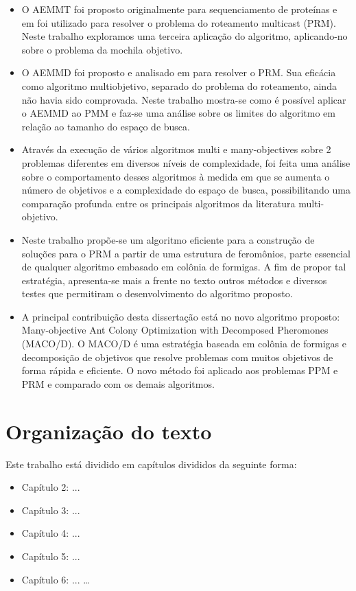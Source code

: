 \begin{itemize}  
	\item O AEMMT foi proposto originalmente para sequenciamento de proteínas \cite{Brasil2013} e em \cite{Lafeta2016} foi utilizado para resolver o problema do roteamento multicast (PRM). Neste trabalho exploramos uma terceira aplicação do algoritmo, aplicando-no sobre o problema da mochila objetivo.
	\item O AEMMD foi proposto e analisado em \cite{Lafeta2016} para resolver o PRM. Sua eficácia como algoritmo multiobjetivo, separado do problema do roteamento, ainda não havia sido comprovada. Neste trabalho mostra-se como é possível aplicar o AEMMD ao PMM e faz-se uma análise sobre os limites do algoritmo em relação ao tamanho do espaço de busca.
	\item Através da execução de vários algoritmos multi e many-objectives sobre 2 problemas diferentes em diversos níveis de complexidade, foi feita uma análise sobre o comportamento desses algoritmos à medida em que se aumenta o número de objetivos e a complexidade do espaço de busca, possibilitando uma comparação profunda entre os principais algoritmos da literatura multi-objetivo.
	\item Neste trabalho propõe-se um algoritmo eficiente para a construção de soluções para o PRM a partir de uma estrutura de feromônios, parte essencial de qualquer algoritmo embasado em colônia de formigas. A fim de propor tal estratégia, apresenta-se mais a frente no texto outros métodos e diversos testes que permitiram o desenvolvimento do algoritmo proposto. 
	\item A principal contribuição desta dissertação está no novo algoritmo proposto: Many-objective Ant Colony Optimization with Decomposed Pheromones (MACO/D). O MACO/D é uma estratégia baseada em colônia de formigas e decomposição de objetivos que resolve problemas com muitos objetivos de forma rápida e eficiente. O novo método foi aplicado aos problemas PPM e PRM e comparado com os demais algoritmos.
\end{itemize}

\section{Organização do texto}
Este trabalho está dividido em capítulos divididos da seguinte forma:

\begin{itemize}  
	\item Capítulo 2: ...
	\item Capítulo 3: ...
	\item Capítulo 4: ...
	\item Capítulo 5: ...
	\item Capítulo 6: ... \ldots
\end{itemize}
